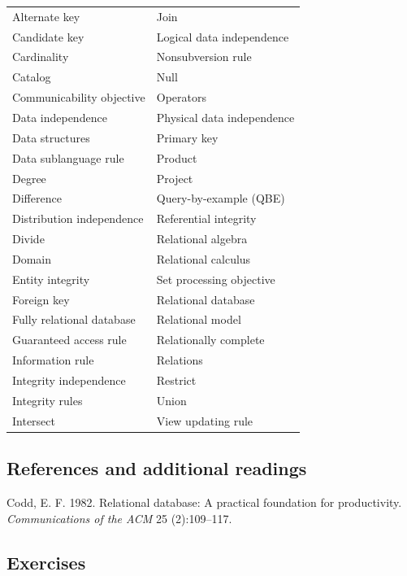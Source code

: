 \documentclass[
]{article}
\begin{document}
\begin{longtable}[]{@{}ll@{}}
\toprule
& \\
\midrule
\endhead
Alternate key & Join \\
Candidate key & Logical data independence \\
Cardinality & Nonsubversion rule \\
Catalog & Null \\
Communicability objective & Operators \\
Data independence & Physical data independence \\
Data structures & Primary key \\
Data sublanguage rule & Product \\
Degree & Project \\
Difference & Query-by-example (QBE) \\
Distribution independence & Referential integrity \\
Divide & Relational algebra \\
Domain & Relational calculus \\
Entity integrity & Set processing objective \\
Foreign key & Relational database \\
Fully relational database & Relational model \\
Guaranteed access rule & Relationally complete \\
Information rule & Relations \\
Integrity independence & Restrict \\
Integrity rules & Union \\
Intersect & View updating rule \\
\bottomrule
\end{longtable}

\hypertarget{references-and-additional-readings-4}{%
\subsection*{References and additional readings}\label{references-and-additional-readings-4}}

Codd, E. F. 1982. Relational database: A practical foundation for
productivity. \emph{Communications of the ACM} 25 (2):109--117.

\hypertarget{exercises-8}{%
\subsection*{Exercises}\label{exercises-8}}
\end{document}
